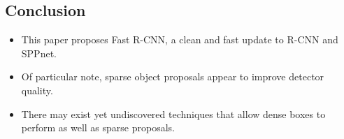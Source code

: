 \documentclass[11pt]{article}
\begin{document}
\subsection{Conclusion}
\label{sec-1-5}


\begin{itemize}
\item This paper proposes Fast R-CNN, a clean and fast update to R-CNN and SPPnet.
\item Of particular note, sparse object proposals appear to improve detector quality.
\item There may exist yet undiscovered techniques that allow dense boxes to perform 
     as well as sparse proposals.
\end{itemize}
\end{document}
